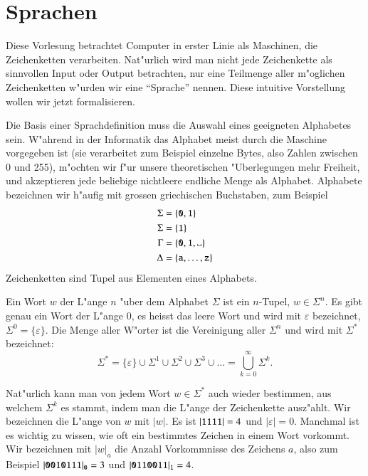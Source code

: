 %
%
%
\chapter{Sprachen\label{chapter-sprachen}}
Diese Vorlesung betrachtet Computer in erster Linie als
Maschinen, die Zeichenketten verarbeiten. Nat"urlich wird man
nicht jede Zeichenkette als sinnvollen Input oder Output betrachten,
nur eine Teilmenge aller m"oglichen Zeichenketten w"urden wir
eine ``Sprache'' nennen. Diese intuitive Vorstellung wollen wir
jetzt formalisieren.

Die Basis einer Sprachdefinition muss die Auswahl eines geeigneten
Alphabetes sein. W"ahrend in der Informatik das Alphabet meist 
durch die Maschine vorgegeben ist (sie verarbeitet zum Beispiel
einzelne Bytes, also Zahlen zwischen 0 und 255), m"ochten wir f"ur
unsere theoretischen "Uberlegungen mehr Freiheit, und akzeptieren
jede beliebige nichtleere endliche Menge als Alphabet. Alphabete
bezeichnen wir h"aufig mit grossen griechischen Buchstaben, zum
Beispiel
\begin{align*}
\Sigma&=\{{\tt 0},{\tt 1}\}\\
\Sigma&=\{{\tt 1}\}\\
\Gamma&=\{{\tt 0},{\tt 1},\blank\}\\
\Delta&=\{{\tt a},\dots,{\tt z}\}
\end{align*}
Zeichenketten sind Tupel aus Elementen eines Alphabets.
\begin{definition}\label{def_wort}
Ein Wort $w$ der L"ange $n$ "uber dem Alphabet $\Sigma$ ist ein $n$-Tupel,
$w\in\Sigma^n$. Es gibt genau ein Wort der L"ange $0$, es heisst das
leere Wort und wird mit $\varepsilon$ bezeichnet, $\Sigma^0=\{\varepsilon\}$.
Die Menge aller W"orter
ist die Vereinigung aller $\Sigma^n$ und wird mit $\Sigma^*$ bezeichnet:
\[
\Sigma^*=\{\varepsilon\}\cup \Sigma^1\cup\Sigma^2\cup\Sigma^3\cup\dots
=\bigcup_{k=0}^\infty\Sigma^k.
\]
\end{definition}

Nat"urlich kann man von jedem Wort $w\in\Sigma^*$ auch wieder bestimmen,
aus welchem $\Sigma^k$ es stammt, indem man die L"ange der Zeichenkette
ausz"ahlt. Wir bezeichnen die L"ange von $w$ mit $|w|$. Es ist $|{\tt 1111}|=4$
und $|\varepsilon|=0$. Manchmal ist es wichtig zu wissen, wie oft ein bestimmtes
Zeichen in einem Wort vorkommt. Wir bezeichnen mit
$|w|_{a}$ die Anzahl Vorkommnisse des Zeichens $a$, also zum Beispiel
$|{\tt 0010111}|_{\tt 0}=3$ und $|{\tt 0110011}|_{\tt 1}=4$.

